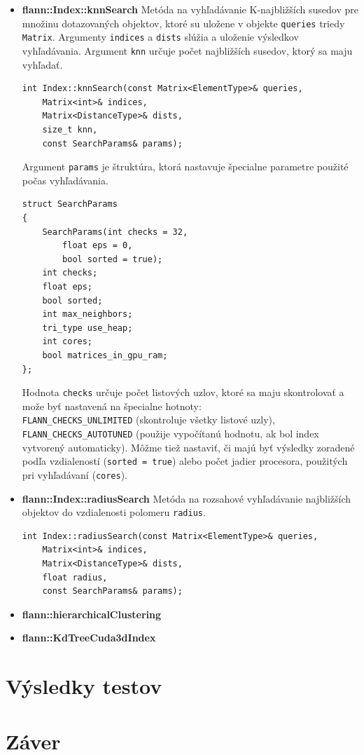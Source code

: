 \documentclass[12pt,oneside]{fithesis2}
\begin{document}
\begin{itemize}
	\item \textbf{flann::Index::knnSearch} Metóda na vyhľadávanie K-najbližších susedov pre množinu dotazovaných objektov, ktoré su uložene v objekte \texttt{queries} triedy \texttt{Matrix}. Argumenty \texttt{indices} a \texttt{dists} slúžia a uloženie výsledkov vyhľadávania. Argument \texttt{knn} určuje počet najbližších susedov, ktorý sa maju vyhľadať. 
{\scriptsize
\begin{lstlisting}
int Index::knnSearch(const Matrix<ElementType>& queries,
	Matrix<int>& indices,
	Matrix<DistanceType>& dists,
	size_t knn,
	const SearchParams& params);
\end{lstlisting}}
Argument \texttt{params} je štruktúra, ktorá nastavuje špecialne parametre použité počas vyhľadávania.
{\scriptsize
\begin{lstlisting}
struct SearchParams
{
	SearchParams(int checks = 32,
		float eps = 0,
		bool sorted = true);
	int checks;
	float eps;
	bool sorted;
	int max_neighbors;
	tri_type use_heap;
	int cores;
	bool matrices_in_gpu_ram;
};
\end{lstlisting}}
Hodnota \texttt{checks} určuje počet listových uzlov, ktoré sa maju skontrolovať a može byť nastavená na špecialne hotnoty:\\ \texttt{FLANN\_CHECKS\_UNLIMITED} (skontroluje všetky listové uzly),\\ \texttt{FLANN\_CHECKS\_AUTOTUNED} (použije vypočítanú hodnotu, ak bol index vytvorený automaticky). Môžme tiež nastaviť, či majú byť výsledky zoradené podľa vzdialeností (\texttt{sorted = true}) alebo počet jadier procesora, použitých pri vyhľadávaní (\texttt{cores}). \cite{manual}

	\item \textbf{flann::Index::radiusSearch} Metóda na rozsahové vyhľadávanie najbližších objektov do vzdialenosti polomeru \texttt{radius}. \cite{manual}
{\scriptsize
\begin{lstlisting}	
int Index::radiusSearch(const Matrix<ElementType>& queries,
	Matrix<int>& indices,
	Matrix<DistanceType>& dists,
	float radius,
	const SearchParams& params);
\end{lstlisting}}	
		
	\item \textbf{flann::hierarchicalClustering}
	
	\item \textbf{flann::KdTreeCuda3dIndex}
	
\end{itemize}		

    \chapter{Výsledky testov}

    \chapter{Záver}
    

{}

\end{document}
